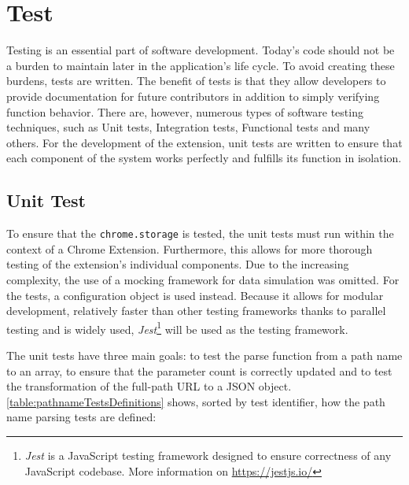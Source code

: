 \chapter{Test}
Testing is an essential part of software development. Today's code should not be a burden to maintain later in the application's life cycle. To avoid creating these burdens, tests are written. The benefit of tests is that they allow developers to provide documentation for future contributors in addition to simply verifying function behavior. There are, however, numerous types of software testing techniques, such as Unit tests, Integration tests, Functional tests and many others. For the development of the extension, unit tests are written to ensure that each component of the system works perfectly and fulfills its function in isolation.

\section{Unit Test}
To ensure that the \texttt{chrome.storage} is tested, the unit tests must run within the context of a Chrome Extension. Furthermore, this allows for more thorough testing of the extension's individual components. Due to the increasing complexity, the use of a mocking framework for data simulation was omitted. For the tests, a configuration object is used instead. Because it allows for modular development, relatively faster than other testing frameworks thanks to parallel testing and is widely used, \emph{Jest}\footnote{\emph{Jest} is a JavaScript testing framework designed to ensure correctness of any JavaScript codebase. More information on \url{https://jestjs.io/}} will be used as the testing framework.

The unit tests have three main goals: to test the parse function from a path name to an array, to ensure that the parameter count is correctly updated and to test the transformation of the full-path URL to a JSON object. \autoref{table:pathnameTestsDefinitions} shows, sorted by test identifier, how the path name parsing tests are defined:

